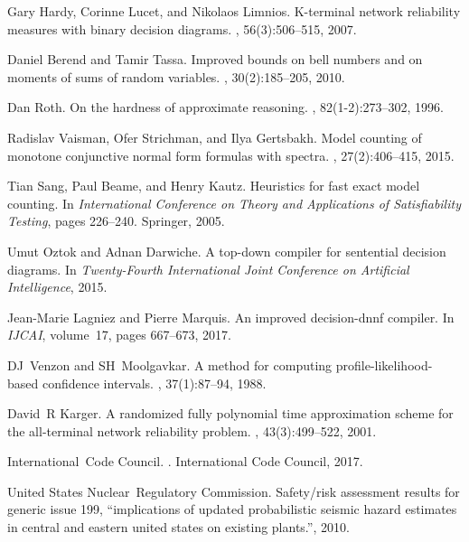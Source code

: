 \documentclass[12pt,twocolumn]{article}
\begin{document}
{\begin{thebibliography}{10}
Gary Hardy, Corinne Lucet, and Nikolaos Limnios.
\newblock K-terminal network reliability measures with binary decision
  diagrams.
, 56(3):506--515, 2007.

Daniel Berend and Tamir Tassa.
\newblock Improved bounds on bell numbers and on moments of sums of random
  variables.
, 30(2):185--205, 2010.

Dan Roth.
\newblock On the hardness of approximate reasoning.
, 82(1-2):273--302, 1996.

Radislav Vaisman, Ofer Strichman, and Ilya Gertsbakh.
\newblock Model counting of monotone conjunctive normal form formulas with
  spectra.
, 27(2):406--415, 2015.

Tian Sang, Paul Beame, and Henry Kautz.
\newblock Heuristics for fast exact model counting.
\newblock In {\em International Conference on Theory and Applications of
  Satisfiability Testing}, pages 226--240. Springer, 2005.

Umut Oztok and Adnan Darwiche.
\newblock A top-down compiler for sentential decision diagrams.
\newblock In {\em Twenty-Fourth International Joint Conference on Artificial
  Intelligence}, 2015.

Jean-Marie Lagniez and Pierre Marquis.
\newblock An improved decision-dnnf compiler.
\newblock In {\em IJCAI}, volume~17, pages 667--673, 2017.

DJ~Venzon and SH~Moolgavkar.
\newblock A method for computing profile-likelihood-based confidence intervals.
, 37(1):87--94, 1988.

David~R Karger.
\newblock A randomized fully polynomial time approximation scheme for the
  all-terminal network reliability problem.
, 43(3):499--522, 2001.

International~Code Council.
.
\newblock International Code Council, 2017.

United States Nuclear~Regulatory Commission.
\newblock Safety/risk assessment results for generic issue 199, “implications
  of updated probabilistic seismic hazard estimates in central and eastern
  united states on existing plants.”, 2010.


\end{thebibliography}}
\end{document}

